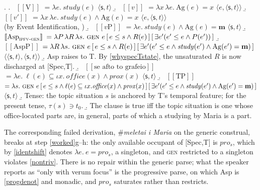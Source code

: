 \documentclass[11pt]{article}
\newcommand{\dbr}[1]{\mbox{ $ [\![ #1 ]\!] $}}
\newcommand{\prs}{\ensuremath{pro_{s}}\xspace}
\newcommand{\sit}{\ensuremath{\mathsf{s}}\xspace}
\newcommand{\ty}[1]{\ensuremath{\langle #1 \rangle}}
\begin{document}
\ex. \label{worked}
\a. \dbr{\mathrm{V}} $= \lambda e.\ \mathit{study}(e)$ \hfill \ty{\sit,t}
\b. \dbr{v} $= \lambda x\, \lambda e.\ \mathrm{Ag}(e) = x$ \hfill \ty{e,\ty{\sit,t}}
\b. \dbr{v'} $= \lambda x\, \lambda e.\ \mathit{study}(e) \wedge \mathrm{Ag}(e) = x$ \hfill \ty{e,\ty{\sit,t}}\\
\hspace*{2em}(by Event Identification, \citealt{kratzer:96})
\b. \dbr{v\mathrm{P}} $= \lambda e.\ \mathit{study}(e) \wedge \mathrm{Ag}(e) = \mathbf{m}$ \hfill \ty{\sit,t}
\b. \dbr{\mathrm{Asp}_{\textsc{ipfv-gen}}} $= \lambda P\, \lambda R\, \lambda s.\ \textsc{gen}\ e\,[\,e\leq s \wedge R(e)\,]\,[\,\exists e'(e'\leq e \wedge P(e'))\,]$
\b. \dbr{\mathrm{AspP}} $= \lambda R\, \lambda s.\ \textsc{gen}\ e\,[\,e\leq s \wedge R(e)\,]\,[\,\exists e'(e'\leq e \wedge \mathit{study}(e') \wedge \mathrm{Ag}(e')=\mathbf{m})\,]$ \hfill \ty{\ty{\sit,t},\ty{\sit,t}}
\b. Asp raises to T.  By \ref{whyspecTstate}, the unsaturated $R$ is now discharged at [Spec,T].
\b. \dbr{\text{se afto to grafeio}} $= \lambda e.\ \ell(e) \subseteq \iota x.\ \mathit{office}(x) \wedge \mathit{prox}(x)$ \hfill \ty{\sit,t}
\b. \dbr{\mathrm{TP}} $= \lambda s.\ \textsc{gen}\ e\,[\,e\leq s \wedge \ell(e) \subseteq \iota x.\mathit{office}(x)\wedge\mathit{prox}(x)\,]\,[\,\exists e'(e'\leq e \wedge \mathit{study}(e')\wedge\mathrm{Ag}(e')=\mathbf{m})\,]$ \hfill \ty{\sit,t}
\b. Tense: the topic situation $s$ is anchored by T's temporal feature; for the present tense, $\tau(s) \ni t_{0}$.
\b. The clause is true iff the topic situation is one whose office-located parts are, in general, parts of which a studying by Maria is a part.

\medskip
The corresponding failed derivation, \#\emph{meletai i Maria} on the generic construal, breaks at step \ref{worked}g--h: the only available occupant of [Spec,T] is \prs, which by \ref{identshift} denotes $\lambda e.\ e = \prs$, a singleton, and \textsc{gen} restricted to a singleton violates \ref{nontriv}.  There is no repair within the generic parse; what the speaker reports as ``only with verum focus'' is the progressive parse, on which Asp is \ref{progdenot} and monadic, and \prs{} saturates rather than restricts.
\end{document}

